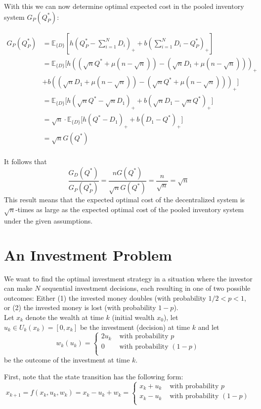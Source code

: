 \documentclass[11pt, oneside]{article}   	%
\begin{document}
With this we can now determine optimal expected cost in the pooled inventory system $G_P(Q_P^*)$:

\begin{align*}
G_P(Q_P^*) &=  \mathbb{E}_{\{D\}}\left[h(Q_P^* - \sum_{i=1}^N D_i)_+ + b(\sum_{i=1}^N D_i - Q_P^*)_+\right]\\
&=  \mathbb{E}_{\{D\}}\big[h((\sqrt{n} Q^* + \mu (n-\sqrt{n})) - (\sqrt{n}D_1 + \mu (n-\sqrt{n})))_+ \\
&+ b((\sqrt{n}D_1 + \mu (n-\sqrt{n})) - (\sqrt{n} Q^* + \mu (n-\sqrt{n})))_+\big]\\
&=  \mathbb{E}_{\{D\}}\big[h(\sqrt{n} Q^* - \sqrt{n}D_1)_+ + b(\sqrt{n}D_1 - \sqrt{n} Q^* )_+\big]\\
&=  \sqrt{n} \cdot \mathbb{E}_{\{D\}}\big[h( Q^* - D_1)_+ + b(D_1 -  Q^* )_+\big]\\
&=  \sqrt{n} G(Q^*)\\
\end{align*}

It follows that
$$
\frac{G_D(Q^*)}{G_P(Q_P^*)} = \frac{n G(Q^*)}{\sqrt{n} G(Q^*)} = \frac{n}{\sqrt{n}} = \sqrt{n} 
$$
This result means that the expected optimal cost of the decentralized system is $\sqrt{n}$-times as large as the expected optimal cost of the pooled inventory system under the given assumptions.


\section{An Investment Problem}
We want to find the optimal investment strategy in a situation where the investor can make $N$ sequential investment decisions, each resulting in one of two possible outcomes: Either (1) the invested money doubles (with probability $1/2 < p < 1$, or (2) the invested money is lost (with probability $1-p$). \\

Let $x_k$ denote the wealth at time $k$ (initial wealth $x_0$), let $u_k \in U_k(x_k) = [0, x_k]$ be the investment (decision) at time $k$ and let 
$$
w_k(u_k) = 
\begin{cases} 
2 u_k & \text{ with probability } p\\
0 & \text{ with probability } (1-p)\\
\end{cases}
$$
be the outcome of the investment at time $k$. 

First, note that the state transition has the following form:
$$
x_{k+1} = f(x_k,u_k,w_k) = x_k - u_k + w_k = 
\begin{cases} 
x_k + u_k & \text{ with probability } p\\
x_k - u_k & \text{ with probability } (1-p)\\
\end{cases}
$$ 
\end{document}
